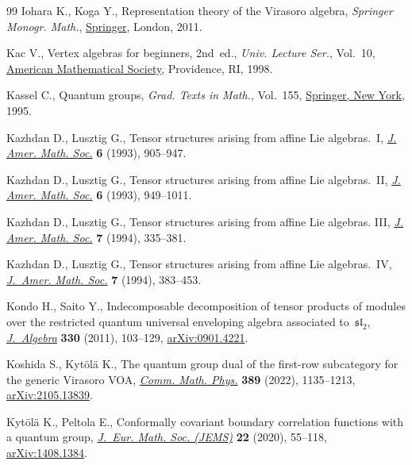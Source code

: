 \documentclass[10pt,a4paper]{amsart}
\numberwithin{equation}{section}
\begin{document}
\begin{thebibliography}{99}
Iohara K., Koga Y., Representation theory of the {V}irasoro algebra, \textit{Springer
 Monogr. Math.}, \href{https://doi.org/10.1007/978-0-85729-160-8}{Springer}, London, 2011.

Kac V., Vertex algebras for beginners, 2nd~ed.,  \textit{Univ. Lecture Ser.}, Vol.~10, \href{https://doi.org/10.1090/ulect/010}{American Mathematical
 Society}, Providence, RI, 1998.

Kassel C., Quantum groups, \textit{Grad. Texts in Math.}, Vol.~155,
 \href{https://doi.org/10.1007/978-1-4612-0783-2}{Springer, New York}, 1995.

Kazhdan D., Lusztig G., Tensor structures arising from affine {L}ie
 algebras.~{I}, \href{https://doi.org/10.2307/2152745}{\textit{J. Amer. Math.
 Soc.}} \textbf{6} (1993), 905--947.

Kazhdan D., Lusztig G., Tensor structures arising from affine {L}ie
 algebras.~{II}, \href{https://doi.org/10.2307/2152746}{\textit{J. Amer. Math.
 Soc.}} \textbf{6} (1993), 949--1011.

Kazhdan D., Lusztig G., Tensor structures arising from affine {L}ie algebras.
 {III}, \href{https://doi.org/10.2307/2152762}{\textit{J. Amer. Math. Soc.}}
 \textbf{7} (1994), 335--381.

Kazhdan D., Lusztig G., Tensor structures arising from affine {L}ie
 algebras.~{IV}, \href{https://doi.org/10.2307/2152763}{\textit{J.~Amer. Math.
 Soc.}} \textbf{7} (1994), 383--453.

Kondo H., Saito Y., Indecomposable decomposition of tensor products of modules
 over the restricted quantum universal enveloping algebra associated
 to~{${\mathfrak{sl}}_2$},
 \href{https://doi.org/10.1016/j.jalgebra.2011.01.010}{\textit{J.~Algebra}}
 \textbf{330} (2011), 103--129,
 \href{http://arxiv.org/abs/0901.4221}{arXiv:0901.4221}.

Koshida S., Kyt\"ol\"a K., The quantum group dual of the first-row subcategory
 for the generic {V}irasoro {VOA},
 \href{https://doi.org/10.1007/s00220-021-04266-w}{\textit{Comm. Math. Phys.}}
 \textbf{389} (2022), 1135--1213,
 \href{http://arxiv.org/abs/2105.13839}{arXiv:2105.13839}.

Kyt\"ol\"a K., Peltola E., Conformally covariant boundary correlation functions
 with a quantum group, \href{https://doi.org/10.4171/jems/917}{\textit{J.~Eur.
 Math. Soc. (JEMS)}} \textbf{22} (2020), 55--118,
 \href{http://arxiv.org/abs/1408.1384}{arXiv:1408.1384}.


\end{thebibliography}
\end{document}
